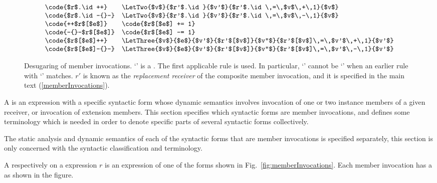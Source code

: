 \documentclass[makeidx]{article}
\begin{document}
{\begin{figure}[t]
\begin{minipage}[h]{\textwidth}
\begin{displaymath}
\begin{array}{ll}
        \code{$r$.\id++} &
        \LetTwo{$v$}{$r'$.\id}{$v'$}{$r'$.\id\,=\,$v$\,+\,1}{$v$}
        \\
        \code{$r$.\id-{}-} &
        \LetTwo{$v$}{$r'$.\id}{$v'$}{$r'$.\id\,=\,$v$\,-\,1}{$v$}
        \\
        \code{++$r$[$e$]} &
        \code{$r$[$e$] += 1}
        \\
        \code{-{}-$r$[$e$]} &
        \code{$r$[$e$] -= 1}
        \\
        \code{$r$[$e$]++} &
        \LetThree{$v$}{$e$}{$v'$}{$r'$[$v$]}{$v''$}{%
          $r'$[$v$]\,=\,$v'$\,+\,1}{$v'$}
        \\
        \code{$r$[$e$]-{}-} &
        \LetThree{$v$}{$e$}{$v'$}{$r'$[$v$]}{$v''$}{%
          $r'$[$v$]\,=\,$v'$\,-\,1}{$v'$}
      \end{array}
    \end{displaymath}
  \end{minipage}
  \caption{Desugaring of member invocations.
    `\code{$\otimes$=}' is a .
    The first applicable rule is used.
    In particular, `\code{$\otimes$=}' cannot be `'
    when an earlier rule with `' matches.
    $r'$ is known as the \emph{replacement receiver} of
    the composite member invocation,
    and it is specified in the main text
    (\ref{memberInvocations}).}
  \label{fig:desugarCompositeMemberInvocations}
\end{figure}

\LMHash{}%
A  is an expression with a specific syntactic form
whose dynamic semantics involves invocation of
one or two instance members of a given receiver,
or invocation of extension members.
This section specifies which syntactic forms are member invocations,
and defines some terminology
which is needed in order to denote
specific parts of several syntactic forms collectively.

\LMHash{}%
The static analysis and dynamic semantics of
each of the syntactic forms that are member invocations
is specified separately,
this section is only concerned with
the syntactic classification and terminology.


\LMHash{}%
A
respectively
on a
expression $r$ is an expression of
one of the forms shown in Fig.~\ref{fig:memberInvocations}.
Each member invocation has a
as shown in the figure.

}
\end{document}
